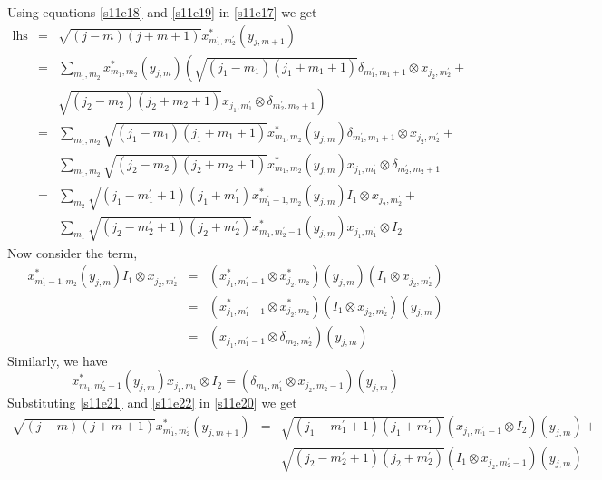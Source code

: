 \documentclass{article}
\numberwithin{equation}{section}
\theoremstyle{plain}
\numberwithin{thm}{section}
\theoremstyle{plain}
\numberwithin{prop}{section}
\theoremstyle{definition}
\numberwithin{defn}{section}
\theoremstyle{remark}
\begin{document}
Using equations \eqref{s11e18} and \eqref{s11e19} in \eqref{s11e17} we get
\begin{eqnarray}
\text{lhs} &=&
 \sqrt{(j-m)(j+m+1)}x_{m_1^\prime,m_2^\prime}^\ast(y_{j,m+1}) \nonumber \\
 &=& \sum_{m_1,m_2}x_{m_1,m_2}^\ast(y_{j,m}) 
 \left(\sqrt{(j_1-m_1)(j_1+m_1+1)}\delta_{m_1^\prime,m_1+1}\otimes
x_{j_2,m_2^\prime} \right. + \nonumber \\
& & \left.\sqrt{(j_2-m_2)(j_2+m_2+1)}x_{j_1,m_1^\prime}\otimes
\delta_{m_2^\prime,m_2+1}\right) \nonumber \\
&=& \sum_{m_1,m_2}\sqrt{(j_1-m_1)(j_1+m_1+1)}x_{m_1,m_2}^\ast(y_{j,m}) 
 \delta_{m_1^\prime,m_1+1}\otimes x_{j_2,m_2^\prime} + \nonumber \\
& & \sum_{m_1,m_2}\sqrt{(j_2-m_2)(j_2+m_2+1)}x_{m_1,m_2}^\ast(y_{j,m})
  x_{j_1,m_1^\prime}\otimes\delta_{m_2^\prime,m_2+1} \nonumber \\
&=& \sum_{m_2}\sqrt{(j_1-m_1^\prime+1)(j_1+m_1^\prime)}
    x_{m_1^\prime-1,m_2}^\ast(y_{j,m}) I_1 \otimes x_{j_2,m_2^\prime} +
\nonumber \\
& & \sum_{m_1}\sqrt{(j_2-m_2^\prime+1)(j_2+m_2^\prime)}
 x_{m_1,m_2^\prime-1}^\ast(y_{j,m}) x_{j_1,m_1^\prime}\otimes I_2 \label{s11e20}
\end{eqnarray}
Now consider the term,
\begin{eqnarray}
x_{m_1^\prime-1,m_2}^\ast(y_{j,m}) I_1 \otimes x_{j_2,m_2^\prime} 
&=& (x^\ast_{j_1,m_1^\prime-1}\otimes x_{j_2,m_2}^\ast)(y_{j,m})
(I_1 \otimes x_{j_2,m_2^\prime}) \nonumber \\
&=& (x^\ast_{j_1,m_1^\prime-1}\otimes x_{j_2,m_2}^\ast)
(I_1 \otimes x_{j_2,m_2^\prime})(y_{j,m}) \nonumber \\
&=& (x_{j_1,m_1^\prime-1} \otimes \delta_{m_2,m_2^\prime})(y_{j,m}) 
\label{s11e21}
\end{eqnarray}
Similarly, we have
\begin{equation}\label{s11e22}
x_{m_1,m_2^\prime-1}^\ast(y_{j,m}) x_{j_1,m_1} \otimes I_2 = 
(\delta_{m_1,m_1^\prime} \otimes x_{j_2,m_2^\prime-1})(y_{j,m})
\end{equation}
Substituting \eqref{s11e21} and \eqref{s11e22} in \eqref{s11e20} we get
\begin{eqnarray}
\sqrt{(j-m)(j+m+1)}x_{m_1^\prime,m_2^\prime}^\ast(y_{j,m+1}) &=&
\sqrt{(j_1-m_1^\prime+1)(j_1+m_1^\prime)}(x_{j_1,m_1^\prime-1}\otimes I_2)
(y_{j,m}) +  \nonumber \\
& & \sqrt{(j_2-m_2^\prime+1)(j_2+m_2^\prime)}(I_1 \otimes x_{j_2,m_2^\prime-1})
(y_{j,m}) \nonumber \\
& & \label{s11e23} 
\end{eqnarray}


\end{document}
